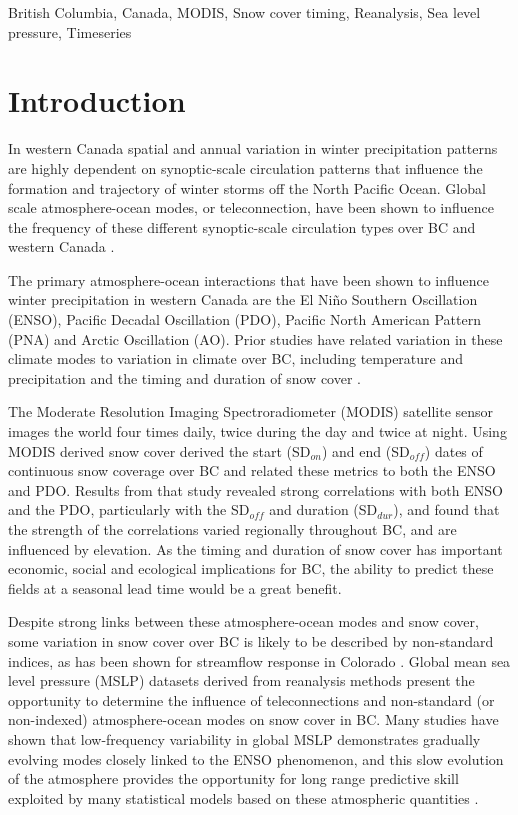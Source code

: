 \documentclass{tATO2e}
\newcommand{\sdoff}{SD$_{off}$}
\newcommand{\sdon}{SD$_{on}$}
\newcommand{\sddur}{SD$_{dur}$}
\begin{document}
\begin{keywords}
British Columbia, Canada, MODIS, Snow cover timing, Reanalysis, Sea level pressure, Timeseries
\end{keywords}


\section{Introduction}
In western Canada spatial and annual variation in winter precipitation patterns are highly dependent on synoptic-scale circulation patterns that influence the formation and trajectory of winter storms off the North Pacific Ocean. Global scale atmosphere-ocean modes, or teleconnection, have been shown to influence the frequency of these different synoptic-scale circulation types over BC and western Canada \citep{Stahl2006-og}.
\par
The primary atmosphere-ocean interactions that have been shown to influence winter precipitation in western Canada are the El Niño Southern Oscillation (ENSO), Pacific Decadal Oscillation (PDO), Pacific North American Pattern (PNA) and Arctic Oscillation (AO). Prior studies have related variation in these climate modes to variation in climate over BC, including temperature and precipitation \citep[e.g.,][]{Shabbar1996-oc, Mantua1997-ri} and the timing and duration of snow cover \citep[e.g.,][]{Moore1996-xr,Bevington2019}. 
\par
The Moderate Resolution Imaging Spectroradiometer (MODIS) satellite sensor images the world four times daily, twice during the day and twice at night. Using MODIS derived snow cover \cite{Bevington2019} derived the start (\sdon{}) and end (\sdoff{}) dates of continuous snow coverage over BC and related these metrics to both the ENSO and PDO. Results from that study revealed strong correlations with both ENSO and the PDO, particularly with the \sdoff{} and duration (\sddur{}), and found that the strength of the correlations varied regionally throughout BC, and are influenced by elevation. As the timing and duration of snow cover has important economic, social and ecological implications for BC, the ability to predict these fields at a seasonal lead time would be a great benefit.
\par
Despite strong links between these atmosphere-ocean modes and snow cover, some variation in snow cover over BC is likely to be described by non-standard indices, as has been shown for streamflow response in Colorado \citep{Regonda2006}. Global mean sea level pressure (MSLP) datasets derived from reanalysis methods present the opportunity to determine the influence of teleconnections and non-standard (or non-indexed) atmosphere-ocean modes on snow cover in BC. Many studies have shown that low-frequency variability in global MSLP demonstrates gradually evolving modes closely linked to the ENSO phenomenon, and this slow evolution of the atmosphere provides the opportunity for long range predictive skill exploited by many statistical models based on these atmospheric quantities \citep{Latif1998}.
\end{document}
